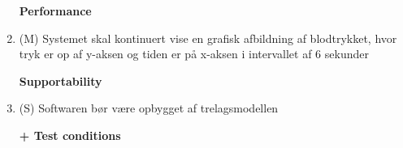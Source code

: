 \begin{enumerate}
\textbf{Performance}
\item (M) Systemet skal kontinuert vise en grafisk afbildning af blodtrykket, hvor tryk er op af y-aksen og tiden er på x-aksen i intervallet af 6 sekunder 

\textbf{Supportability}
\item (S) Softwaren bør være opbygget af trelagsmodellen

\textbf{+ Test conditions}
\end{enumerate}




